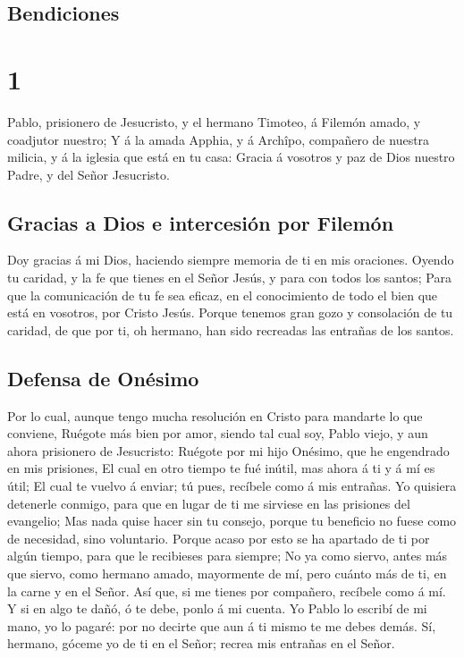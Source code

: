 \hypertarget{bendiciones}{%
\subsection{Bendiciones}\label{bendiciones}}

\hypertarget{section}{%
\section{1}\label{section}}

 Pablo, prisionero de Jesucristo, y el hermano Timoteo, á
Filemón amado, y coadjutor nuestro;  Y á la amada Apphia, y
á Archîpo, compañero de nuestra milicia, y á la iglesia que está en tu
casa:  Gracia á vosotros y paz de Dios nuestro Padre, y del
Señor Jesucristo.

\hypertarget{gracias-a-dios-e-intercesiuxf3n-por-filemuxf3n}{%
\subsection{Gracias a Dios e intercesión por
Filemón}\label{gracias-a-dios-e-intercesiuxf3n-por-filemuxf3n}}

 Doy gracias á mi Dios, haciendo siempre memoria de ti en
mis oraciones.  Oyendo tu caridad, y la fe que tienes en el
Señor Jesús, y para con todos los santos;  Para que la
comunicación de tu fe sea eficaz, en el conocimiento de todo el bien que
está en vosotros, por Cristo Jesús.  Porque tenemos gran
gozo y consolación de tu caridad, de que por ti, oh hermano, han sido
recreadas las entrañas de los santos.

\hypertarget{defensa-de-onuxe9simo}{%
\subsection{Defensa de Onésimo}\label{defensa-de-onuxe9simo}}

 Por lo cual, aunque tengo mucha resolución en Cristo para
mandarte lo que conviene,  Ruégote más bien por amor, siendo
tal cual soy, Pablo viejo, y aun ahora prisionero de Jesucristo:
 Ruégote por mi hijo Onésimo, que he engendrado en mis
prisiones,  El cual en otro tiempo te fué inútil, mas ahora
á ti y á mí es útil;  El cual te vuelvo á enviar; tú pues,
recíbele como á mis entrañas.  Yo quisiera detenerle
conmigo, para que en lugar de ti me sirviese en las prisiones del
evangelio;  Mas nada quise hacer sin tu consejo, porque tu
beneficio no fuese como de necesidad, sino voluntario. 
Porque acaso por esto se ha apartado de ti por algún tiempo, para que le
recibieses para siempre;  No ya como siervo, antes más que
siervo, como hermano amado, mayormente de mí, pero cuánto más de ti, en
la carne y en el Señor.  Así que, si me tienes por
compañero, recíbele como á mí.  Y si en algo te dañó, ó te
debe, ponlo á mi cuenta.  Yo Pablo lo escribí de mi mano,
yo lo pagaré: por no decirte que aun á ti mismo te me debes demás.
 Sí, hermano, góceme yo de ti en el Señor; recrea mis
entrañas en el Señor.

